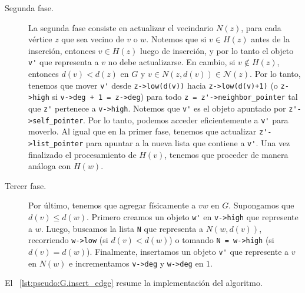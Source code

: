 \documentclass[%
    a4paper,%
    fontsize=12pt,%
    DIV=12,
    twoside,%
    openright,%
    titlepage=true,%
    headsepline,%
    toc=bibliography,%
    parskip=half,%
    cleardoublepage=empty,%
    headings=big,%
]{scrbook}
\makeatletter
\newcommand{\Code}[1]{\lstinline[basicstyle={\ttfamily}]@#1@}
\newcommand{\N}{\mathcal{N}}
\makeatother
\begin{document}
\begin{description}
\item [Segunda fase.]  La segunda fase consiste en actualizar el vecindario $N(z)$, para cada vértice $z$ que sea vecino de $v$ o $w$.  Notemos que si $v \in H(z)$ antes de la inserción, entonces $v \in H(z)$ luego de inserción, y por lo tanto el objeto \Code{v'} que representa a $v$ no debe actualizarse.  En cambio, si $v \not\in H(z)$, entonces $d(v) < d(z)$ en $G$ y $v \in N(z, d(v)) \in \N(z)$.  Por lo tanto, tenemos que mover \Code{v'} desde \Code{z->low(d(v))} hacia \Code{z->low(d(v)+1)} (o \Code{z->high} si \Code{v->deg + 1 = z->deg}) para todo \Code{z = z'->neighbor_pointer} tal que \Code{z'} pertenece a \Code{v->high}.  Notemos que \Code{v'} es el objeto apuntado por \Code{z'->self_pointer}.  Por lo tanto, podemos acceder eficientemente a \Code{v'} para moverlo.  Al igual que en la primer fase, tenemos que actualizar \Code{z'->list_pointer} para apuntar a la nueva lista que contiene a \Code{v'}.  Una vez finalizado el procesamiento de $H(v)$, tenemos que proceder de manera análoga con $H(w)$.
%
\item [Tercer fase.] Por último, tenemos que agregar físicamente a $vw$ en $G$.  Supongamos que $d(v) \leq d(w)$.  Primero creamos un objeto \Code{w'} en \Code{v->high} que represente a $w$.  Luego, buscamos la lista \Code{N} que representa a $N(w, d(v))$, recorriendo \Code{w->low} (si $d(v) < d(w)$) o tomando \Code{N = w->high} (si $d(v) = d(w)$).  Finalmente, insertamos un objeto \Code{v'} que represente a $v$ en $N(w)$ e  incrementamos \Code{v->deg} y \Code{w->deg} en $1$.  
\end{description}
El \lstlistingname~\ref{lst:pseudo:G.insert_edge} resume la implementación del algoritmo.
\end{document}

